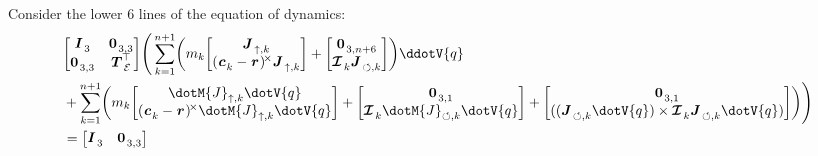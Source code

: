 Consider the lower $6$ lines of the equation of dynamics:
%
\begin{equation}
\begin{aligned}
    &
    \begin{bmatrix}
        \M{I}_3   &   \M{0}_{3,3} \\
        \M{0}_{3,3}   &   \T{\Teuler}\\
    \end{bmatrix}
    \Bigg(
        \sum_{k=1}^{n+1}
        \left(
            m_k
            \begin{bmatrix}
                \M{J}_{\TRAN,k}                     \\
                \CROSS[(\V{c}_k - \V{r})] \M{J}_{\TRAN,k}\\
            \end{bmatrix}
            +
            \begin{bmatrix}
                \M{0}_{3,n+6}                                              \\
                \INERTIA_k \M{J}_{\ROT,k}\\
            \end{bmatrix}
        \right)
        \ddotV{q}
        \\
        &+
        \sum_{k=1}^{n+1}
        \left(
            m_k
            \begin{bmatrix}
                \dotM{J}_{\TRAN,k} \dotV{q}                     \\
                \CROSS[(\V{c}_k - \V{r})] \dotM{J}_{\TRAN,k} \dotV{q}\\
            \end{bmatrix}
            +
            \begin{bmatrix}
                \M{0}_{3,1}                                              \\
                \INERTIA_k \dotM{J}_{\ROT,k} \dotV{q}\\
            \end{bmatrix}
            +
            \begin{bmatrix}
                \M{0}_{3,1}                                          \\
                ((\M{J}_{\ROT,k} \dotV{q}) \CROSS \INERTIA_k \M{J}_{\ROT,k} \dotV{q})\\
            \end{bmatrix}
        \right)
    \Bigg)
    \\
    & =
    \begin{bmatrix}
        \M{I}_3   &   \M{0}_{3,3} \\

\end{bmatrix}
\end{aligned}
\end{equation}
